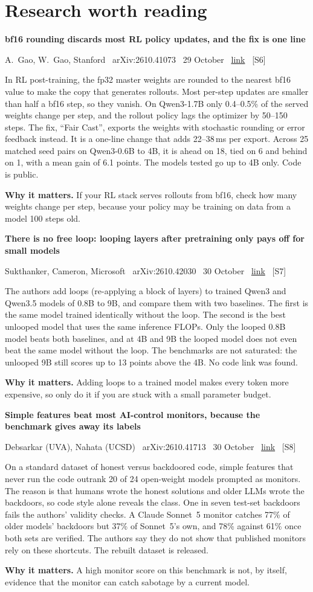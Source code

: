 \documentclass[11pt,a4paper]{article}
\newcommand{\entry}[4]{%
  \par\Needspace{7\baselineskip}\vspace{0.7em}%
  {\sffamily\bfseries\color{brandink}#1}\par
  {\footnotesize\color{brandgrey}#2 \textbullet\ \href{#3}{link} \textbullet\ \srcref{#4}}\par
  \vspace{0.15em}}
\newcommand{\why}[1]{\par{\small\textbf{Why it matters.} #1}\par}
\newcommand{\srcref}[1]{\textcolor{brandaccent}{[S#1]}}
\begin{document}
\section{Research worth reading}

\entry{bf16 rounding discards most RL policy updates, and the fix is one line}{A.\ Gao, W.\ Gao, Stanford \textbullet\ arXiv:2610.41073 \textbullet\ 29 October}{https://arxiv.org/abs/2610.41073}{6}
In RL post-training, the fp32 master weights are rounded to the nearest bf16 value to make the copy that generates rollouts. Most per-step updates are smaller than half a bf16 step, so they vanish. On Qwen3-1.7B only 0.4--0.5\%
of the served weights change per step, and the rollout policy lags the optimizer by 50--150 steps. The fix, ``Fair Cast'', exports the weights with stochastic rounding or error feedback instead.
It is a one-line change that adds 22--38\,ms per export. Across 25 matched seed pairs on Qwen3-0.6B to 4B, it is ahead on 18, tied on 6 and behind on 1, with a mean gain of 6.1 points. The models tested go up to 4B only. Code is public.
\why{If your RL stack serves rollouts from bf16, check how many weights change per step, because your policy may be training on data from a model 100 steps old.}

\entry{There is no free loop: looping layers after pretraining only pays off for small models}{Sukthanker, Cameron, Microsoft \textbullet\ arXiv:2610.42030 \textbullet\ 30 October}{https://arxiv.org/abs/2610.42030}{7}
The authors add loops (re-applying a block of layers) to trained Qwen3 and Qwen3.5 models of 0.8B to 9B, and compare them with two baselines. The first is the same model trained identically without the loop. The second is the best unlooped model that uses the same inference FLOPs.
Only the looped 0.8B model beats both baselines, and at 4B and 9B the looped model does not even beat the same model without the loop. The benchmarks are not saturated: the unlooped 9B still scores up to 13 points above the 4B. No code link was found.
\why{Adding loops to a trained model makes every token more expensive, so only do it if you are stuck with a small parameter budget.}

\entry{Simple features beat most AI-control monitors, because the benchmark gives away its labels}{Debsarkar (UVA), Nahata (UCSD) \textbullet\ arXiv:2610.41713 \textbullet\ 30 October}{https://arxiv.org/abs/2610.41713}{8}
On a standard dataset of honest versus backdoored code, simple features that never run the code outrank 20 of 24 open-weight models prompted as monitors. The reason is that humans wrote the honest solutions and older LLMs wrote the backdoors,
so code style alone reveals the class. One in seven test-set backdoors fails the authors' validity checks. A Claude Sonnet~5 monitor catches 77\% of older models' backdoors but 37\% of Sonnet~5's own, and 78\% against 61\% once both sets are verified.
The authors say they do not show that published monitors rely on these shortcuts. The rebuilt dataset is released.
\why{A high monitor score on this benchmark is not, by itself, evidence that the monitor can catch sabotage by a current model.}
\end{document}
